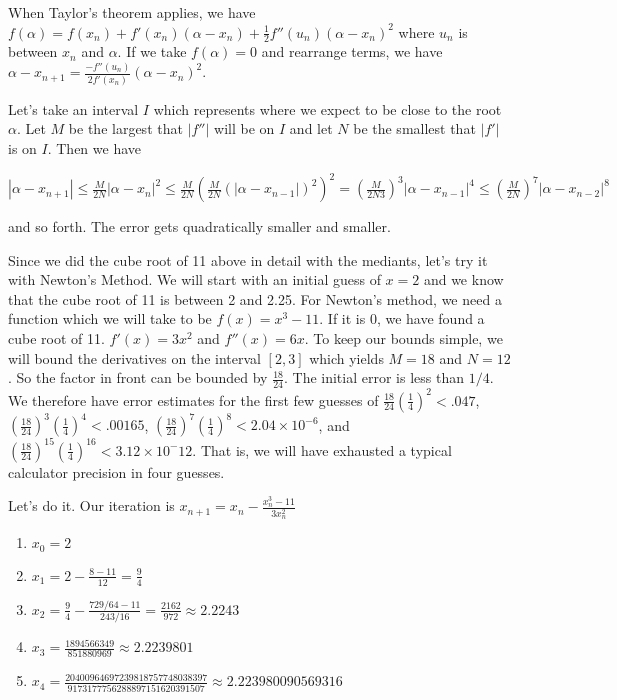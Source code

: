 \documentclass[12pt]{article}
\theoremstyle{remark}
\begin{document}
When Taylor's theorem applies, we have $f(\alpha) = f(x_n) +f'(x_n)(\alpha - x_n) + \frac{1}{2} f''(u_n) (\alpha - x_n)^2$ where $u_n$ is between $x_n$ and $\alpha$. If we take $f(\alpha) = 0$ and rearrange terms, we have $\alpha - x_{n+1} = \frac{-f''(u_n)}{2 f'(x_n) } (\alpha - x_n)^2$.

Let's take an interval $I$ which represents where we expect to be close to the root $\alpha$. Let $M$ be the largest that $|f''|$ will be on $I$ and let $N$ be the smallest that $|f'|$ is on $I$. Then we have 

$|\alpha - x_{n+1}| \leq \frac{M}{2N} |\alpha - x_n|^2 \leq \frac{M}{2N} (\frac{M}{2N}(|\alpha-x_{n-1}|)^2)^2 = (\frac{M}{2N3})^3 |\alpha-x_{n-1}|^4 \leq (\frac{M}{2N})^7 |\alpha-x_{n-2}|^8 $

and so forth. The error gets quadratically smaller and smaller. 

Since we did the cube root of 11 above in detail with the mediants, let's try it with Newton's Method. We will start with an initial guess of $x=2$ and we know that the cube root of 11 is between 2 and 2.25. For Newton's method, we need a function which we will take to be $f(x) = x^3 - 11$. If it is 0, we have found a cube root of 11. $f'(x) = 3x^2$ and $f''(x) = 6x$. To keep our bounds simple, we will bound the derivatives on the interval $[2,3]$ which yields $M = 18$ and $N = 12$. So the factor in front can be bounded by $\frac{18}{24}$. The initial error is less than $1/4$. We therefore have error estimates for the first few guesses of $\frac{18}{24}(\frac{1}{4})^2 < .047$, $(\frac{18}{24})^3(\frac{1}{4})^4 < .00165$, $(\frac{18}{24})^7(\frac{1}{4})^8 < 2.04\times 10^{-6}$, and $(\frac{18}{24})^15(\frac{1}{4})^16 < 3.12 \times 10^-12$. That is, we will have exhausted a typical calculator precision in four guesses. 

Let's do it. Our iteration is $x_{n+1} = x_n - \frac{x_n^3 -11}{3 x_n^2}$ 
\begin{enumerate}
\item $x_0 = 2$
\item $x_1 = 2 - \frac{8- 11}{12} = \frac{9}{4}$
\item $x_2 = \frac{9}{4} - \frac{ 729/64 - 11 }{243/16} = \frac{2162}{972}\approx 2.2243$
\item $x_3 = \frac{1894566349}{851880969} \approx 2.2239801$
\item $x_4 = \frac{20400964697239818757748038397}{9173177756288897151620391507} \approx 2.223980090569316$
\end{enumerate}
\end{document}
